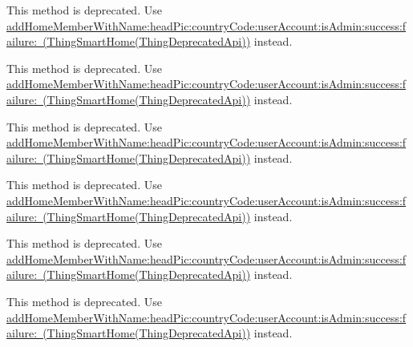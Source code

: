 \begin{DoxyRefList}
\label{deprecated__deprecated000063}%
%
This method is deprecated. Use \mbox{\hyperlink{category_thing_smart_home_07_thing_deprecated_api_08_aa06ed0850cb14733eb33f539a81e0650}{add\+Home\+Member\+With\+Name\+:head\+Pic\+:country\+Code\+:user\+Account\+:is\+Admin\+:success\+:failure\+: (\+Thing\+Smart\+Home(\+Thing\+Deprecated\+Api))}} instead. 

\label{deprecated__deprecated000009}%
%
This method is deprecated. Use \mbox{\hyperlink{category_thing_smart_home_07_thing_deprecated_api_08_aa06ed0850cb14733eb33f539a81e0650}{add\+Home\+Member\+With\+Name\+:head\+Pic\+:country\+Code\+:user\+Account\+:is\+Admin\+:success\+:failure\+: (\+Thing\+Smart\+Home(\+Thing\+Deprecated\+Api))}} instead. 

\label{deprecated__deprecated000045}%
%
This method is deprecated. Use \mbox{\hyperlink{category_thing_smart_home_07_thing_deprecated_api_08_aa06ed0850cb14733eb33f539a81e0650}{add\+Home\+Member\+With\+Name\+:head\+Pic\+:country\+Code\+:user\+Account\+:is\+Admin\+:success\+:failure\+: (\+Thing\+Smart\+Home(\+Thing\+Deprecated\+Api))}} instead.  
\item[(Thing\+Deprecated\+Api) Member \mbox{\hyperlink{category_thing_smart_home_member_07_thing_deprecated_api_08_aa99d024659e1a37f17921c2010c9c22d}{\mbox{[}Thing\+Smart\+Home\+Member(Thing\+Deprecated\+Api) add\+Home\+Member\+With\+Home\+Id\+:name\+:head\+Pic\+:country\+Code\+:user\+Account\+:is\+Admin\+:success\+:failure\+:\mbox{]}}} ]\label{deprecated__deprecated000065}%
%
This method is deprecated. Use \mbox{\hyperlink{category_thing_smart_home_07_thing_deprecated_api_08_aa06ed0850cb14733eb33f539a81e0650}{add\+Home\+Member\+With\+Name\+:head\+Pic\+:country\+Code\+:user\+Account\+:is\+Admin\+:success\+:failure\+: (\+Thing\+Smart\+Home(\+Thing\+Deprecated\+Api))}} instead. 

\label{deprecated__deprecated000011}%
%
This method is deprecated. Use \mbox{\hyperlink{category_thing_smart_home_07_thing_deprecated_api_08_aa06ed0850cb14733eb33f539a81e0650}{add\+Home\+Member\+With\+Name\+:head\+Pic\+:country\+Code\+:user\+Account\+:is\+Admin\+:success\+:failure\+: (\+Thing\+Smart\+Home(\+Thing\+Deprecated\+Api))}} instead. 

\label{deprecated__deprecated000029}%
%
This method is deprecated. Use \mbox{\hyperlink{category_thing_smart_home_07_thing_deprecated_api_08_aa06ed0850cb14733eb33f539a81e0650}{add\+Home\+Member\+With\+Name\+:head\+Pic\+:country\+Code\+:user\+Account\+:is\+Admin\+:success\+:failure\+: (\+Thing\+Smart\+Home(\+Thing\+Deprecated\+Api))}} instead. 


\end{DoxyRefList}
